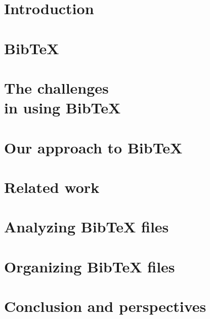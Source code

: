 \documentclass[twoside,11pt,openright,a4paper]{report}
\newcommand{\bibtex}{Bib{\TeX}}
\begin{document}

\chapter{Introduction}
\label{ch:intro}


\chapter{{\bibtex}}
\label{ch:about}


\chapter{The challenges\\in using {\bibtex}}
\label{ch:problem-description}


\chapter{Our approach to {\bibtex}}
\label{ch:approach}


\chapter{Related work}
\label{ch:related}


\chapter{Analyzing {\bibtex} files}
\label{ch:analyzing}


\chapter{Organizing {\bibtex} files}
\label{ch:organizing}


\chapter{Conclusion and perspectives}
\label{ch:conclusion}


\printbibliography{}
\end{document}
